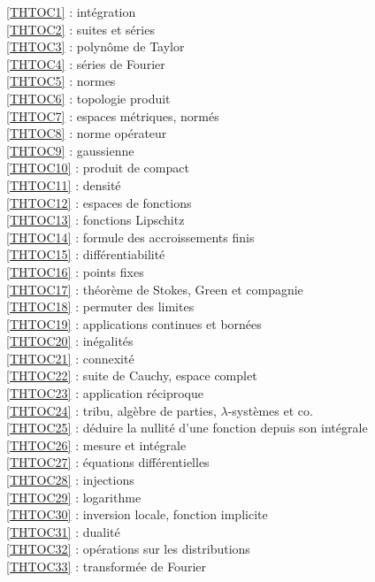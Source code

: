 \ref {THTOC1} : intégration\\
\ref {THTOC2} : suites et séries\\
\ref {THTOC3} : polynôme de Taylor\\
\ref {THTOC4} : séries de Fourier\\
\ref {THTOC5} : normes\\
\ref {THTOC6} : topologie produit\\
\ref {THTOC7} : espaces métriques, normés\\
\ref {THTOC8} : norme opérateur\\
\ref {THTOC9} : gaussienne\\
\ref {THTOC10} : produit de compact\\
\ref {THTOC11} : densité\\
\ref {THTOC12} : espaces de fonctions\\
\ref {THTOC13} : fonctions Lipschitz\\
\ref {THTOC14} : formule des accroissements finis\\
\ref {THTOC15} : différentiabilité\\
\ref {THTOC16} : points fixes\\
\ref {THTOC17} : théorème de Stokes, Green et compagnie\\
\ref {THTOC18} : permuter des limites\\
\ref {THTOC19} : applications continues et bornées\\
\ref {THTOC20} : inégalités\\
\ref {THTOC21} : connexité\\
\ref {THTOC22} : suite de Cauchy, espace complet\\
\ref {THTOC23} : application réciproque\\
\ref {THTOC24} : tribu, algèbre de parties, \( \lambda \)-systèmes et co.\\
\ref {THTOC25} : déduire la nullité d'une fonction depuis son intégrale\\
\ref {THTOC26} : mesure et intégrale\\
\ref {THTOC27} : équations différentielles\\
\ref {THTOC28} : injections\\
\ref {THTOC29} : logarithme\\
\ref {THTOC30} : inversion locale, fonction implicite\\
\ref {THTOC31} : dualité\\
\ref {THTOC32} : opérations sur les distributions\\
\ref {THTOC33} : transformée de Fourier\\
